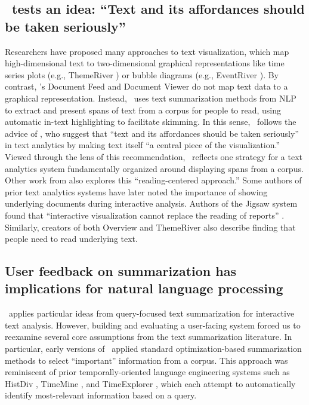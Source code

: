 \subsection{\ours~tests an idea: {``Text and its affordances should be taken seriously''}\label{s:text_seriously}}
Researchers have proposed many approaches to text visualization, which map high-dimensional text to two-dimensional graphical representations like time series plots (e.g., ThemeRiver \cite{ThemeRiver}) or bubble diagrams (e.g., EventRiver \cite{eventriver}).
By contrast, \ours's Document Feed and Document Viewer do not map text data to a graphical representation. Instead, \ours~uses text summarization methods from NLP to extract and present spans of text from a corpus for people to read, using automatic in-text highlighting to facilitate skimming.
In this sense, \ours~follows the advice of \citet{moretextplease}, who suggest that {``text and its affordances should be taken seriously''} in text analytics by making text itself ``a central piece of the visualization.''
Viewed through the lens of this recommendation, \ours~reflects one strategy for a text analytics system fundamentally organized around displaying spans from a corpus.
Other work from \citet{storifier} also explores this ``reading-centered approach.''
Some authors of prior text analytics systems have later noted the importance of showing underlying documents during interactive analysis. 
Authors of the Jigsaw system found that ``interactive visualization cannot replace the reading of reports'' \cite{Gorg2013JigsawReflections}.
Similarly, creators of both Overview \cite[Sec.\ 5]{stray} and ThemeRiver \cite[Sec.\ 7]{ThemeRiver} also describe finding that people need to read underlying text.

\subsection{User feedback on summarization has implications for natural language processing}\label{s:discussion_NLP}

\ours~applies particular ideas from query-focused text summarization for interactive text analysis.
However, building and evaluating a user-facing system forced us to reexamine several core assumptions from the text summarization literature.
In particular, early versions of \ours~applied standard optimization-based summarization methods \cite{McDonald} to select ``important'' information from a corpus.
This approach was reminiscent of prior temporally-oriented language engineering systems such as HistDiv \cite{histdiv}, TimeMine \cite{allen}, and TimeExplorer \cite{TimeExplorer}, which each attempt to automatically identify most-relevant information based on a query. 

